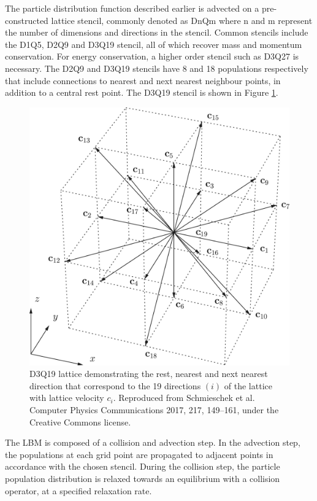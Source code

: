 The particle distribution function described earlier is advected on a pre-constructed lattice stencil, commonly denoted as DnQm where n and m represent the 
number of dimensions and directions in the stencil. Common stencils include the D1Q5, D2Q9 and D3Q19 stencil, all of which recover mass and momentum conservation. 
For energy conservation, a higher order stencil such as D3Q27 is necessary. The D2Q9 and D3Q19 stencils have 8 and 18 populations respectively that include 
connections to nearest and next nearest neighbour points, in addition to a central rest point. The D3Q19 stencil is shown in Figure \ref{fig:d3q19_lattice}.

\begin{figure}[h]
    \centering
    \includegraphics[scale = 1]{figures/methods/d3q19_lattice.jpg}
    \caption{D3Q19 lattice demonstrating the rest, nearest and next nearest direction that correspond to the 19 
    directions $(i)$ of the lattice with lattice velocity $c_{i}$. \cite{schmieschek_lb3d_2017} Reproduced from 
    Schmieschek et al. Computer Physics Communications 2017, 217, 149--161, under the Creative Commons license.}
    \label{fig:d3q19_lattice}
\end{figure}

The LBM is composed of a collision and advection step. In the advection step, the populations at each grid point are propagated to adjacent points in accordance 
with the chosen stencil. During the collision step, the particle population distribution is relaxed towards an equilibrium with a collision operator, at a 
specified relaxation rate. 

